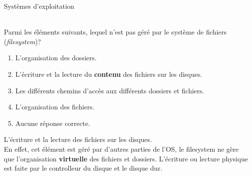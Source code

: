 \begin{section}{Systèmes d'exploitation}
    
    
     \begin{Exercice}[2 minutes]\\
    Parmi les éléments suivants, lequel n'est pas géré par le système de fichiers (\textit{filesystem})?
        \begin{enumerate}
            \item L'organisation des dossiers.
            \item L'écriture et la lecture du \textbf{contenu} des fichiers sur les disques.
            \item Les différents chemins d'accès aux différents dossiers et fichiers.
            \item L'organisation des fichiers.
            \item Aucune réponse correcte.
        \end{enumerate}
    \end{Exercice}
    
    \begin{solution}
        L'écriture et la lecture des fichiers sur les disques. \\
        En effet, cet élément est géré par d'autres parties de l'OS, le filesystem ne gère que l'organisation \textbf{virtuelle} des fichiers et dossiers. L'écriture ou lecture physique est faite par le controlleur du disque et le disque dur. \\ 
    \end{solution}
    
\end{section}

